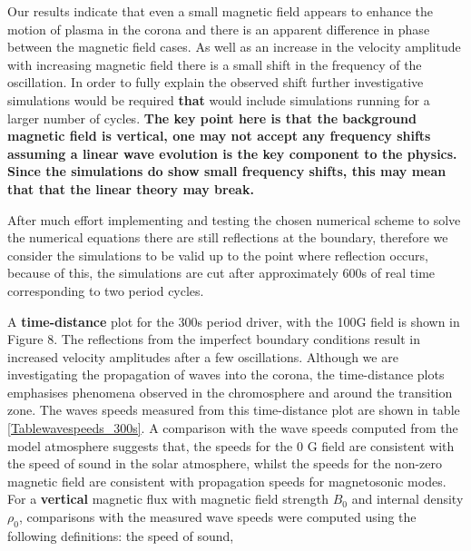 \documentclass[physics,article,submit,pdftex,moreauthors]{Definitions/mdpi}
\begin{document}
  Our results indicate that even a small magnetic field appears to enhance the motion of plasma in the corona and  there is an apparent difference in phase between the magnetic field cases. As well as an increase in the velocity amplitude with increasing magnetic field there is a small shift in the frequency of the oscillation. In order to fully explain the observed shift further investigative simulations would be required {\bf that} would include simulations running for a larger number of cycles. {\bf The key point here is that the background magnetic field is vertical, one may not accept any frequency shifts assuming a linear wave evolution is the key component to the physics. Since the simulations do show small frequency shifts, this may mean that that the linear theory may break.}
  











After much  effort implementing and testing  the chosen numerical scheme to solve the numerical equations there are still reflections at the boundary, therefore we consider the simulations to be valid up to the point where reflection occurs, because of this, the simulations are cut after approximately 600s of real time corresponding to two period cycles.

A {\bf time-distance} plot for the 300s period driver, with the 100G field is shown in Figure 8. The reflections from the imperfect boundary conditions result in increased velocity amplitudes after a few oscillations. Although we are investigating the propagation of waves into the corona, the time-distance plots emphasises phenomena observed in the chromosphere and around the transition zone.  The waves speeds measured from this time-distance plot are shown in table \ref{Tablewavespeeds_300s}. A comparison with the wave speeds computed from the model atmosphere suggests that, the speeds for the 0 G field are consistent with the speed of sound in the solar atmosphere, whilst the speeds for the non-zero magnetic field are consistent with propagation speeds for magnetosonic modes.
For a {\bf vertical} magnetic flux %
with magnetic field strength $B_{0}$ and internal density $\rho_{0}$, comparisons with the measured wave speeds were computed using the following definitions:
the speed of sound,
\end{document}
